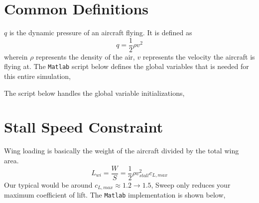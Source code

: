 \documentclass[letter, 12pt]{article}
\begin{document}
\begin{center}
\section{Common Definitions}
\begin{comment}
\end{comment}
$q$ is the dynamic pressure of an aircraft flying. It is defined as
$$q = \frac{1}{2}\rho v^{2}$$
wherein $\rho$ represents the density of the air, $v$ represents the velocity the aircraft is flying at.
The \texttt{Matlab} script below defines the global variables that is needed for this entire simulation,

$$$$
The script below handles the global variable initializations,


\section{Stall Speed Constraint}
\begin{comment}
\end{comment}
Wing loading is basically the weight of the aircraft divided by the total wing area.
$$L_{wi} = \frac{W}{S} = \frac{1}{2}\rho v_{stall}^{2} c_{L,max}$$
Our typical would be around $c_{L,max} \approx 1.2 \to 1.5$, 
Sweep only reduces your maximum coefficient of lift. The \texttt{Matlab} implementation is shown below,



\end{center}
\end{document}
